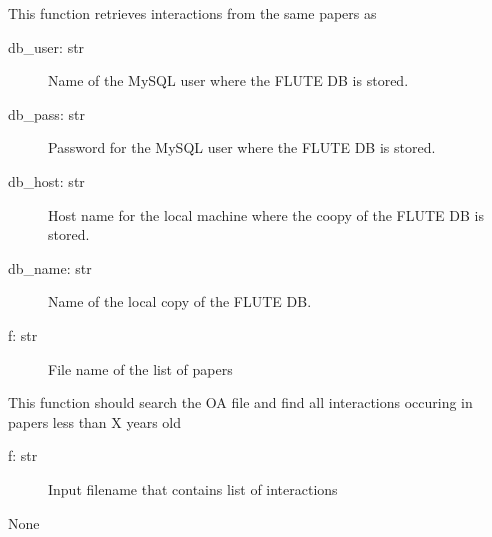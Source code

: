 \documentclass[a4paper,10pt,english]{sphinxmanual}
\begin{document}
\begin{fulllineitems}
\label{\detokenize{run_FLUTE:run_FLUTE.getRelatedInts}}
\sphinxAtStartPar
This function retrieves interactions from the same papers as
\begin{description}
\item[{db\_user: str}] \leavevmode
\sphinxAtStartPar
Name of the MySQL user where the FLUTE DB is stored.

\item[{db\_pass: str}] \leavevmode
\sphinxAtStartPar
Password for the MySQL user where the FLUTE DB is stored.

\item[{db\_host: str }] \leavevmode
\sphinxAtStartPar
Host name for the local machine where the coopy of the FLUTE DB is stored.

\item[{db\_name: str}] \leavevmode
\sphinxAtStartPar
Name of the local copy of the FLUTE DB.

\item[{f: str}] \leavevmode
\sphinxAtStartPar
File name of the list of papers

\end{description}

\end{fulllineitems}


\begin{fulllineitems}
\label{\detokenize{run_FLUTE:run_FLUTE.getRecentPapers}}
\sphinxAtStartPar
This function should search the OA file and find all interactions occuring in papers less than X years old
\begin{description}
\item[{f: str}] \leavevmode
\sphinxAtStartPar
Input filename that contains list of interactions

\end{description}

\sphinxAtStartPar
None

\end{fulllineitems}
\end{document}

